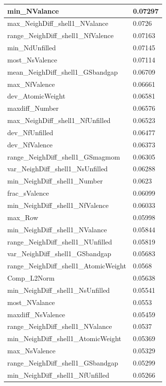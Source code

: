 \begin{longtable}{|l|l|}
min\_NValance & 0.07297 \\ \hline
max\_NeighDiff\_shell1\_NValance & 0.0726 \\ \hline
range\_NeighDiff\_shell1\_NfValence & 0.07163 \\ \hline
min\_NdUnfilled & 0.07145 \\ \hline
most\_NsValence & 0.07114 \\ \hline
mean\_NeighDiff\_shell1\_GSbandgap & 0.06709 \\ \hline
max\_NfValence & 0.06661 \\ \hline
dev\_AtomicWeight & 0.06581 \\ \hline
maxdiff\_Number & 0.06576 \\ \hline
max\_NeighDiff\_shell1\_NfUnfilled & 0.06523 \\ \hline
dev\_NfUnfilled & 0.06477 \\ \hline
dev\_NfValence & 0.06373 \\ \hline
range\_NeighDiff\_shell1\_GSmagmom & 0.06305 \\ \hline
var\_NeighDiff\_shell1\_NsUnfilled & 0.06288 \\ \hline
min\_NeighDiff\_shell1\_Number & 0.0623 \\ \hline
frac\_sValence & 0.06099 \\ \hline
min\_NeighDiff\_shell1\_NfValence & 0.06033 \\ \hline
max\_Row & 0.05998 \\ \hline
min\_NeighDiff\_shell1\_NValance & 0.05844 \\ \hline
range\_NeighDiff\_shell1\_NUnfilled & 0.05819 \\ \hline
var\_NeighDiff\_shell1\_GSbandgap & 0.05683 \\ \hline
range\_NeighDiff\_shell1\_AtomicWeight & 0.0568 \\ \hline
Comp\_L2Norm & 0.05638 \\ \hline
min\_NeighDiff\_shell1\_NsUnfilled & 0.05541 \\ \hline
most\_NValance & 0.0553 \\ \hline
maxdiff\_NsValence & 0.05459 \\ \hline
range\_NeighDiff\_shell1\_NValance & 0.0537 \\ \hline
min\_NeighDiff\_shell1\_AtomicWeight & 0.05369 \\ \hline
max\_NsValence & 0.05329 \\ \hline
range\_NeighDiff\_shell1\_GSbandgap & 0.05299 \\ \hline
min\_NeighDiff\_shell1\_NfUnfilled & 0.05266 \\ \hline

\end{longtable}

